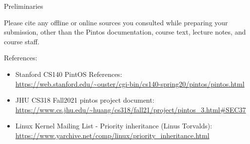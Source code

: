 \begin{titlepage}
\begin{aspect}{Preliminaries}
\begin{tcolorbox}
      Please cite any offline or online sources you consulted while
      preparing your submission, other than the Pintos documentation, course
      text, lecture notes, and course staff.
    \end{tcolorbox}
    References:
    \begin{itemize}
      \item Stanford CS140 PintOS References: \\
            \url{https://web.stanford.edu/~ouster/cgi-bin/cs140-spring20/pintos/pintos.html}
      \item JHU CS318 Fall2021 pintos project document: \\
            \url {https://www.cs.jhu.edu/~huang/cs318/fall21/project/pintos_3.html#SEC37}
      \item Linux Kernel Mailing List - Priority inheritance (Linus Torvalds): \\
            \url{https://www.yarchive.net/comp/linux/priority_inheritance.html}
    \end{itemize}
  \end{aspect}

\end{titlepage}

